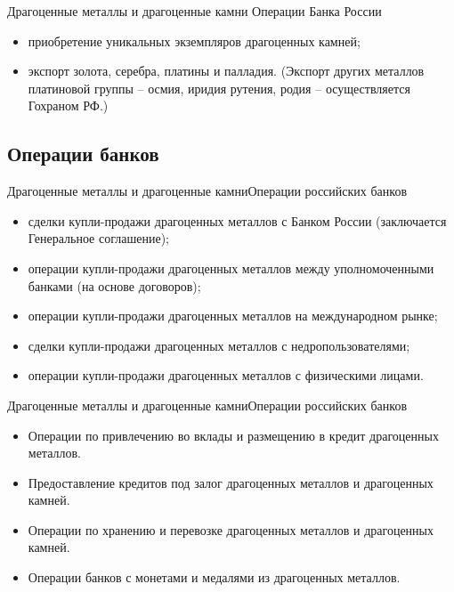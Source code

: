 \documentclass[_Banking_p3.tex]{subfiles}
\begin{document}
\begin{frame} {Драгоценные металлы и драгоценные камни} {Операции Банка России}
\begin{itemize}[<+->]
\item
приобретение уникальных экземпляров драгоценных камней;
\item
экспорт золота, серебра, платины и палладия. (Экспорт других металлов платиновой группы – осмия, иридия рутения, родия – осуществляется Гохраном РФ.)
\end{itemize}
\end{frame}

\subsection{Операции банков}
\begin{frame}{Драгоценные металлы и драгоценные камни}{Операции российских банков}
\begin{itemize}[<+->]

\item
сделки купли-продажи драгоценных металлов с Банком России (заключается Генеральное соглашение);

\item
операции купли-продажи драгоценных металлов между уполномоченными банками (на основе договоров);

\item
операции купли-продажи драгоценных металлов на международном рынке;

\item
сделки купли-продажи драгоценных металлов с недропользователями;

\item
операции купли-продажи драгоценных металлов с физическими лицами.
\end{itemize}
\end{frame}

\begin{frame}{Драгоценные металлы и драгоценные камни}{Операции российских банков}
\begin{itemize}[<+->]

\item
Операции по привлечению во вклады и размещению в кредит драгоценных металлов.

\item
Предоставление кредитов под залог драгоценных металлов и драгоценных камней.

\item
Операции по хранению и перевозке драгоценных металлов и драгоценных камней.

\item
Операции банков с монетами и медалями из драгоценных металлов. 
\end{itemize}
\end{frame}
\end{document}
